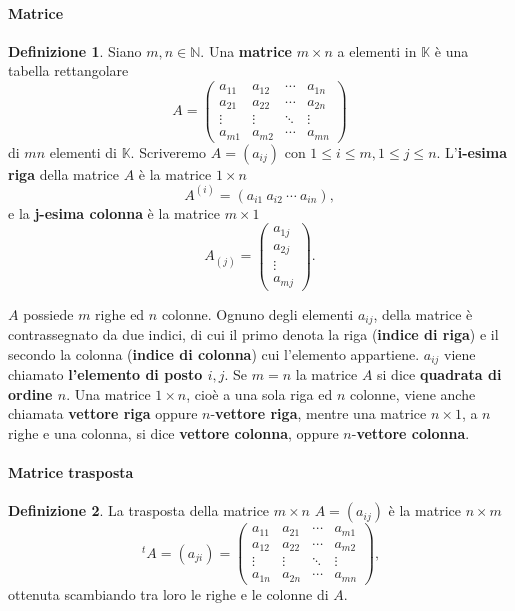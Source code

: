 \documentclass{article}
\theoremstyle{plain}
\theoremstyle{definition}
\newtheorem{defn}{Definizione}[section]
\theoremstyle{remark}
\begin{document}
\paragraph{Matrice}
\begin{bxthm}
\begin{defn}
    Siano \( m, n \in\mathbb{N}\). Una \textbf{matrice} \( m \times n \) a elementi in \( \mathbb{K} \) è una tabella rettangolare
\[
A = \begin{pmatrix}
a_{11} & a_{12} & \cdots & a_{1n} \\
a_{21} & a_{22} & \cdots & a_{2n} \\
\vdots & \vdots & \ddots & \vdots \\
a_{m1} & a_{m2} & \cdots & a_{mn}
\end{pmatrix}
\]
di \( mn \) elementi di \( \mathbb{K} \). Scriveremo $A = (a_{ij})$ con $1 \leq i \leq m,1 \leq j \leq n$.
L'\textbf{i-esima riga} della matrice \( A \) è la matrice \( 1 \times n \)
\[
A^{(i)} = (a_{i1} \ a_{i2} \ \cdots \ a_{in}),
\]
e la \textbf{j-esima colonna} è la matrice \( m \times 1 \)
\[
A_{(j)} = \begin{pmatrix}
a_{1j} \\
a_{2j} \\
\vdots \\
a_{mj}
\end{pmatrix}.
\]
\end{defn}
\( A \) possiede \( m \) righe ed \( n \) colonne. Ognuno degli elementi \( a_{ij} \), della matrice è contrassegnato da due indici, di cui il primo denota la riga (\textbf{indice di riga}) e il secondo la colonna (\textbf{indice di colonna}) cui l'elemento appartiene. 
\( a_{ij} \) viene chiamato \textbf{l'elemento di posto \( i, j \)}. Se \( m = n \) la matrice \( A \) si dice \textbf{quadrata di ordine \( n \)}. Una matrice \( 1 \times n \), cioè a una sola riga ed \( n \) colonne, viene anche chiamata \textbf{vettore riga} oppure \( n \)-\textbf{vettore riga}, mentre una matrice \( n \times 1 \), a \( n \) righe e una colonna, si dice \textbf{vettore colonna}, oppure \( n \)-\textbf{vettore colonna}.
\end{bxthm}

\vspace{10pt}

\paragraph{Matrice trasposta}
\begin{bxthm}
\begin{defn}
    La trasposta della matrice \( m \times n \) \( A = (a_{ij}) \) è la matrice \( n \times m \)
\[
    \ ^{t}A = (a_{ji}) = \begin{pmatrix}
a_{11} & a_{21} & \cdots & a_{m1} \\
a_{12} & a_{22} & \cdots & a_{m2} \\
\vdots & \vdots & \ddots & \vdots \\
a_{1n} & a_{2n} & \cdots & a_{mn}
\end{pmatrix},
\]
ottenuta scambiando tra loro le righe e le colonne di \( A \).
\end{defn}
\end{bxthm}
\end{document}
